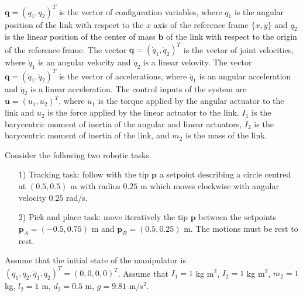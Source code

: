\documentclass{article}
\begin{document}
$
\mathbf{q} =
(
q_1, q_2
)^T
$ 
is the vector of configuration variables, where $q_1$ is the
angular position of the link with respect to the $x$ axis of the reference
frame $\{x, y\}$ and $q_2$ is the linear position of the center of mass $\mathbf{b}$ of the link with respect to the origin of the reference frame.
The
vector
$
\dot{\mathbf{q}} =
(\dot{q}_1,
\dot{q}_2)^T
$ 
is the vector of joint velocities, where $\dot{q}_1$ is an angular
velocity and $\dot{q}_2$ is a linear velovity. The vector
$
\ddot{\mathbf{q}} =
(\ddot{q}_1,
\ddot{q}_2)^T
$
is the vector of accelerations, where  $\ddot{q}_1$ is an angular
acceleration and $\ddot{q}_2$ is a linear acceleration. The control inputs of the system are
$
\mathbf{u} =
(u_1,
u_2)^T
$,
where $u_1$ is the torque applied by the angular actuator to the link and
$u_2$ is the force applied by the linear actuator to the link. 
$I_1$ is the barycentric moment of inertia of the angular and linear actuators,
$I_2$ is the barycentric moment of inertia of the link, and $m_2$ is the mass of the link.

\newpage

Consider the following two robotic tasks.

\begin{itemize}

\item[1)]
Tracking task:  follow with the tip $\mathbf{p}$ a setpoint describing a circle centred at $(0.5, 0.5)$ m with radius $0.25$ m which moves clockwise with angular velocity $0.25$ rad/s. 

\item[2)]
Pick and place task: move iteratively the tip $\mathbf{p}$ between the setpoints $\mathbf{p}_A = (-0.5, 0.75)$ m and 
$\mathbf{p}_B = (0.5, 0.25)$ m. The motions must be rest to rest.

\end{itemize}

Assume that the initial state of the manipulator is $(q_1, q_2, \dot{q}_1, \dot{q}_2)^T= (0, 0, 0, 0)^T$. 
Assume that 
$I_1=1$ kg m$^2$,
$I_2=1$  kg m$^2$,
$m_2=1$ kg,
$l_2=1$ m,
$d_2=0.5$ m,
$g=9.81$ m/s$^2$.
\end{document}
